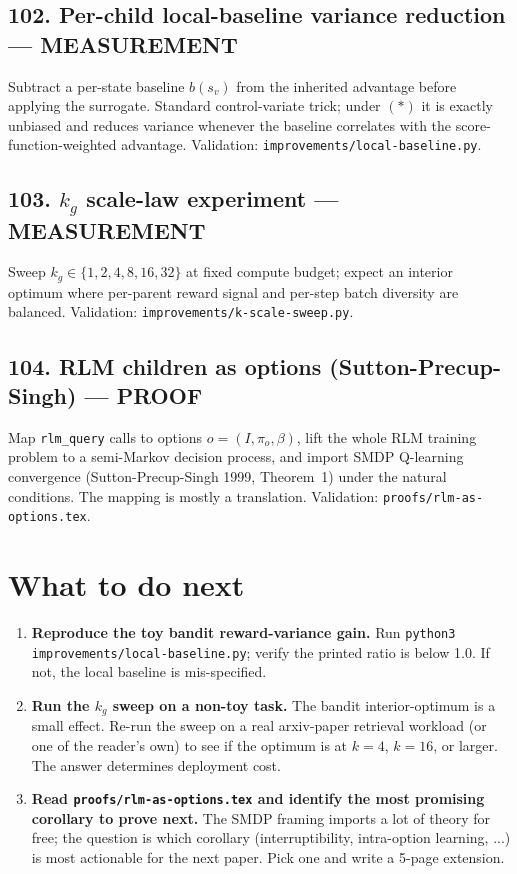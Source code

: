 \documentclass[11pt]{article}
\begin{document}
\subsection*{102. Per-child local-baseline variance reduction --- MEASUREMENT}
Subtract a per-state baseline $b(s_v)$ from the inherited advantage before
applying the surrogate. Standard control-variate trick; under $(*)$ it is
exactly unbiased and reduces variance whenever the baseline correlates with
the score-function-weighted advantage. Validation:
\texttt{improvements/local-baseline.py}.

\subsection*{103. $k_g$ scale-law experiment --- MEASUREMENT}
Sweep $k_g \in \{1, 2, 4, 8, 16, 32\}$ at fixed compute budget; expect an
interior optimum where per-parent reward signal and per-step batch diversity
are balanced. Validation: \texttt{improvements/k-scale-sweep.py}.

\subsection*{104. RLM children as options (Sutton-Precup-Singh) --- PROOF}
Map \texttt{rlm\_query} calls to options $o = (I, \pi_o, \beta)$, lift the
whole RLM training problem to a semi-Markov decision process, and import SMDP
Q-learning convergence (Sutton-Precup-Singh 1999, Theorem~1) under the
natural conditions. The mapping is mostly a translation. Validation:
\texttt{proofs/rlm-as-options.tex}.

\section{What to do next}

\begin{enumerate}
\item \textbf{Reproduce the toy bandit reward-variance gain.} Run
      \texttt{python3 improvements/local-baseline.py}; verify the printed
      ratio is below 1.0. If not, the local baseline is mis-specified.
\item \textbf{Run the $k_g$ sweep on a non-toy task.} The bandit
      interior-optimum is a small effect. Re-run the sweep on a real
      arxiv-paper retrieval workload (or one of the reader's own) to see if
      the optimum is at $k = 4$, $k = 16$, or larger. The answer determines
      deployment cost.
\item \textbf{Read \texttt{proofs/rlm-as-options.tex} and identify the most
      promising corollary to prove next.} The SMDP framing imports a lot of
      theory for free; the question is which corollary (interruptibility,
      intra-option learning, ...) is most actionable for the next paper.
      Pick one and write a 5-page extension.
\end{enumerate}
\end{document}
